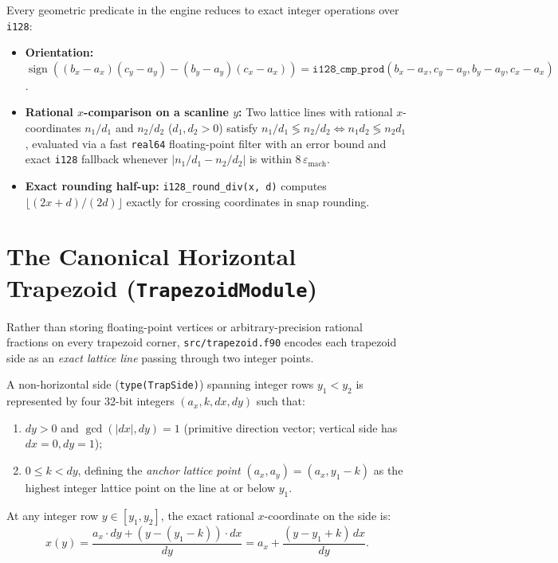 Every geometric predicate in the engine reduces to exact integer operations over \texttt{i128}:
\begin{itemize}
  \item \textbf{Orientation:} $\operatorname{sign}((b_x - a_x)(c_y - a_y) - (b_y - a_y)(c_x - a_x)) = \texttt{i128\_cmp\_prod}(b_x - a_x, c_y - a_y, b_y - a_y, c_x - a_x)$.
  \item \textbf{Rational $x$-comparison on a scanline $y$:} Two lattice lines with rational $x$-coordinates $n_1/d_1$ and $n_2/d_2$ ($d_1, d_2 > 0$) satisfy $n_1/d_1 \lessgtr n_2/d_2 \iff n_1 d_2 \lessgtr n_2 d_1$, evaluated via a fast \texttt{real64} floating-point filter with an error bound and exact \texttt{i128} fallback whenever $|n_1/d_1 - n_2/d_2|$ is within $8\,\varepsilon_{\text{mach}}$.
  \item \textbf{Exact rounding half-up:} \texttt{i128\_round\_div(x, d)} computes $\lfloor (2x + d)/(2d) \rfloor$ exactly for crossing coordinates in snap rounding.
\end{itemize}

\section{The Canonical Horizontal Trapezoid (\texttt{TrapezoidModule})}

Rather than storing floating-point vertices or arbitrary-precision rational fractions on every trapezoid corner, \texttt{src/trapezoid.f90} encodes each trapezoid side as an \emph{exact lattice line} passing through two integer points.

\begin{definition}
A non-horizontal side (\texttt{type(TrapSide)}) spanning integer rows $y_1 < y_2$ is represented by four 32-bit integers $(a_x, k, dx, dy)$ such that:
\begin{enumerate}
  \item $dy > 0$ and $\gcd(|dx|, dy) = 1$ (primitive direction vector; vertical side has $dx = 0, dy = 1$);
  \item $0 \le k < dy$, defining the \emph{anchor lattice point} $(a_x, a_y) = (a_x, y_1 - k)$ as the highest integer lattice point on the line at or below $y_1$.
\end{enumerate}
At any integer row $y \in [y_1, y_2]$, the exact rational $x$-coordinate on the side is:
\begin{equation}
  x(y) = \frac{a_x \cdot dy + (y - (y_1 - k)) \cdot dx}{dy} = a_x + \frac{(y - y_1 + k)\,dx}{dy}.
  \label{eq:side_x}
\end{equation}
\end{definition}

